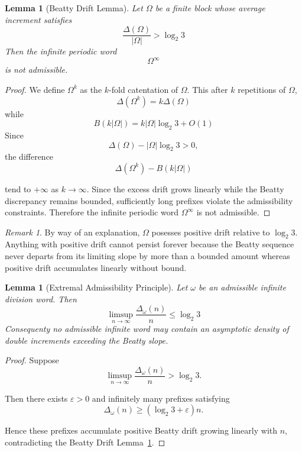 \documentclass[12pt, oneside]{article}
\numberwithin{equation}{section}
\theoremstyle{definition}
\theoremstyle{plain}
\newtheorem{lemma}[theorem]{Lemma}
\theoremstyle{remark}
\newtheorem*{remark}{Remark}
\begin{document}
\begin{lemma}[Beatty Drift Lemma]
\label{lem:beatty-drift-lemma}
Let \(\Omega\) be a finite block whose average increment satisfies
\[
\frac{\Delta(\Omega)}{|\Omega|} > \log_2 3
\]
Then the infinite periodic word
\[
\Omega^{\infty}
\]
is not admissible.
\end{lemma}
\begin{proof}
We define \(\Omega^k\) as the \(k\)-fold catentation of \(\Omega\).
This after \(k\) repetitions of \(\Omega\),
\[
\Delta(\Omega^k) = k \Delta(\Omega)
\]
while
\[
B(k|\Omega|) = k |\Omega| \log_2 3 + O(1)
\]
Since
\[
\Delta(\Omega) - |\Omega| \log_2 3 > 0,
\]
the difference
\[
\Delta(\Omega^k) - B(k|\Omega|)
\]

tend to \(+\infty\) as \(k \to \infty\). Since the excess drift grows
linearly while the Beatty discrepancy remains bounded, sufficiently long
prefixes violate the admissibility constraints. Therefore the infinite
periodic word \(\Omega^{\infty}\) is not admissible.
\end{proof}

\begin{remark}
By way of an explanation, \(\Omega\) posesses positive drift relative to
\(\log_2 3\). Anything with positive drift cannot persist forever because
the Beatty sequence never departs from its limiting slope by more than a
bounded amount whereas positive drift accumulates linearly without bound.
\end{remark}

\begin{lemma}[Extremal Admissibility Principle]
\label{lem:extremal-admissibility-principle}
Let \(\omega\) be an admissible infinite division word. Then
\[
\limsup_{n\to\infty} \frac{\Delta_\omega(n)}{n} \le \log_2 3
\]
Consequenty no admissible infinite word may contain an asymptotic density
of double increments exceeding the Beatty slope.
\end{lemma}

\begin{proof}
Suppose
\[
\limsup_{n\to\infty} \frac{\Delta_\omega(n)}{n} > \log_2 3.
\]

Then there exists
\(\varepsilon>0\)
and infinitely many prefixes satisfying
\[
\Delta_\omega(n) \ge (\log_2 3+\varepsilon)n.
\]

Hence these prefixes accumulate positive Beatty drift growing linearly
with \(n\), contradicting the Beatty Drift Lemma~\ref{lem:beatty-drift-lemma}.
\end{proof}
\end{document}
